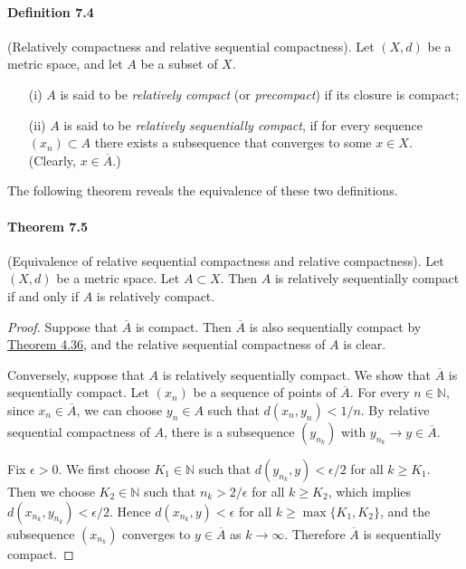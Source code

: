 \documentclass{article}
\numberwithin{equation}{section}
\theoremstyle{plain}
\theoremstyle{definition}
\begin{document}
\paragraph{Definition 7.4\label{def:7.4}} (Relatively compactness and relative sequential compactness). Let $(X,d)$ be a metric space, and let $A$ be a subset of $X$. 
\begin{itemize}
	\item[(i)] $A$ is said to be \textit{relatively compact} (or \textit{precompact}) if its closure is compact;
	\item[(ii)] $A$ is said to be \textit{relatively sequentially compact}, if for every sequence $(x_n)\subset A$ there exists a subsequence that converges to some $x\in X$. (Clearly, $x\in\overline{A}$.)
\end{itemize}

The following theorem reveals the equivalence of these two definitions.
\paragraph{Theorem 7.5\label{thm:7.5}} (Equivalence of relative sequential compactness and relative compactness). Let $(X,d)$ be a metric space. Let $A\subset X$. Then $A$ is relatively sequentially compact if and only if $A$ is relatively compact.
\begin{proof}
Suppose that $\overline{A}$ is compact. Then $\overline{A}$ is also sequentially compact by \hyperref[thm:4.36]{Theorem 4.36}, and the relative sequential compactness of $A$ is clear.

Conversely, suppose that $A$ is relatively sequentially compact. We show that $\overline{A}$ is sequentially compact. Let $(x_n)$ be a sequence of points of $\overline{A}$. For every $n\in\mathbb{N}$, since $x_n\in\overline{A}$, we can choose $y_n\in A$ such that $d(x_n,y_n)<1/n$. By relative sequential compactness of $A$, there is a subsequence $(y_{n_k})$ with $y_{n_k}\to y\in\overline{A}$. 

Fix $\epsilon > 0$. We first choose $K_1\in\mathbb{N}$ such that $d(y_{n_k},y)<\epsilon/2$ for all $k\geq K_1$. Then we choose $K_2\in\mathbb{N}$ such that $n_k > 2/\epsilon$ for all $k\geq K_2$, which implies $d(x_{n_k},y_{n_k})<\epsilon/2$. Hence $d(x_{n_k},y) < \epsilon$ for all $k\geq\max\{K_1,K_2\}$, and the subsequence $(x_{n_k})$ converges to $y\in\overline{A}$ as $k\to\infty$. Therefore $\overline{A}$ is sequentially compact.
\end{proof}
\end{document}
